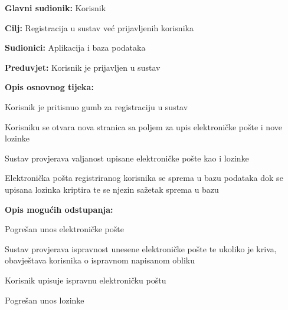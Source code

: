 				
				\noindent {}
				\begin{packed_item}
					
					\item \textbf{Glavni sudionik: }Korisnik
					\item  \textbf{Cilj:} Registracija u sustav već prijavljenih korisnika
					\item  \textbf{Sudionici:} Aplikacija i baza podataka
					\item  \textbf{Preduvjet:} Korisnik je prijavljen u sustav
					\item  \textbf{Opis osnovnog tijeka:}
					
					\item[] \begin{packed_enum}
						
						\item Korisnik je pritisnuo gumb za registraciju u sustav
						\item Korisniku se otvara nova stranica sa poljem za upis elektroničke pošte i nove lozinke
						\item Sustav provjerava valjanost upisane elektroničke pošte kao i lozinke
						\item Elektronička pošta registriranog korisnika se sprema u bazu podataka dok se upisana lozinka kriptira te se njezin sažetak sprema u bazu 

					\end{packed_enum}
					
					\item  \textbf{Opis mogućih odstupanja:}
					
					\item[] \begin{packed_item}
						
						\item[3.a] Pogrešan unos elektroničke pošte
						\item[] \begin{packed_enum}
							
							\item Sustav provjerava ispravnost unesene elektroničke pošte te ukoliko je kriva, obavještava korisnika o ispravnom napisanom obliku
							\item Korisnik upisuje ispravnu elektroničku poštu
							
						\end{packed_enum}
						\item[3.b] Pogrešan unos lozinke
						\item[] \begin{packed_enum}
							

\end{packed_enum}
\end{packed_item}
\end{packed_item}
